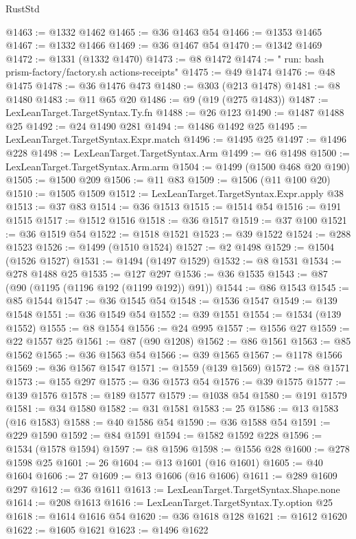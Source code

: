 \begin{lexlean}{RustStd}
\begin{coremodule}
@1463 := @1332 @1462
@1465 := @36 @1463 @54
@1466 := @1353 @1465
@1467 := @1332 @1466
@1469 := @36 @1467 @54
@1470 := @1342 @1469
@1472 := @1331 (@1332 @1470)
@1473 := @8 @1472
@1474 := "        run: bash prism-factory/factory.sh actions-receipts"
@1475 := @49 @1474
@1476 := @48 @1475
@1478 := @36 @1476 @473
@1480 := @303 (@213 @1478)
@1481 := @8 @1480
@1483 := @11 @65 @20
@1486 := @9 (@19 (@275 @1483))
@1487 := LexLeanTarget.TargetSyntax.Ty.fn
@1488 := @26 @123
@1490 := @1487 @1488 @25
@1492 := @24 @1490 @281
@1494 := @1486 @1492 @25
@1495 := LexLeanTarget.TargetSyntax.Expr.match
@1496 := @1495 @25
@1497 := @1496 @228
@1498 := LexLeanTarget.TargetSyntax.Arm
@1499 := @6 @1498
@1500 := LexLeanTarget.TargetSyntax.Arm.arm
@1504 := @1499 (@1500 @468 @20 @190)
@1505 := @1500 @209
@1506 := @11 @83
@1509 := @1506 (@11 @100 @20)
@1510 := @1505 @1509
@1512 := LexLeanTarget.TargetSyntax.Expr.apply @38
@1513 := @37 @83
@1514 := @36 @1513
@1515 := @1514 @54
@1516 := @191 @1515
@1517 := @1512 @1516
@1518 := @36 @1517
@1519 := @37 @100
@1521 := @36 @1519 @54
@1522 := @1518 @1521
@1523 := @39 @1522
@1524 := @288 @1523
@1526 := @1499 (@1510 @1524)
@1527 := @2 @1498
@1529 := @1504 (@1526 @1527)
@1531 := @1494 (@1497 @1529)
@1532 := @8 @1531
@1534 := @278 @1488 @25
@1535 := @127 @297
@1536 := @36 @1535
@1543 := @87 (@90 (@1195 (@1196 @192 (@1199 @192)) @91))
@1544 := @86 @1543
@1545 := @85 @1544
@1547 := @36 @1545 @54
@1548 := @1536 @1547
@1549 := @139 @1548
@1551 := @36 @1549 @54
@1552 := @39 @1551
@1554 := @1534 (@139 @1552)
@1555 := @8 @1554
@1556 := @24 @995
@1557 := @1556 @27
@1559 := @22 @1557 @25
@1561 := @87 (@90 @1208)
@1562 := @86 @1561
@1563 := @85 @1562
@1565 := @36 @1563 @54
@1566 := @39 @1565
@1567 := @1178 @1566
@1569 := @36 @1567 @1547
@1571 := @1559 (@139 @1569)
@1572 := @8 @1571
@1573 := @155 @297
@1575 := @36 @1573 @54
@1576 := @39 @1575
@1577 := @139 @1576
@1578 := @189 @1577
@1579 := @1038 @54
@1580 := @191 @1579
@1581 := @34 @1580
@1582 := @31 @1581
@1583 := 25
@1586 := @13 @1583 (@16 @1583)
@1588 := @40 @1586 @54
@1590 := @36 @1588 @54
@1591 := @229 @1590
@1592 := @84 @1591
@1594 := @1582 @1592 @228
@1596 := @1534 (@1578 @1594)
@1597 := @8 @1596
@1598 := @1556 @28
@1600 := @278 @1598 @25
@1601 := 26
@1604 := @13 @1601 (@16 @1601)
@1605 := @40 @1604
@1606 := 27
@1609 := @13 @1606 (@16 @1606)
@1611 := @289 @1609 @297
@1612 := @36 @1611
@1613 := LexLeanTarget.TargetSyntax.Shape.none
@1614 := @208 @1613
@1616 := LexLeanTarget.TargetSyntax.Ty.option @25
@1618 := @1614 @1616 @54
@1620 := @36 @1618 @128
@1621 := @1612 @1620
@1622 := @1605 @1621
@1623 := @1496 @1622

\end{coremodule}
\end{lexlean}
